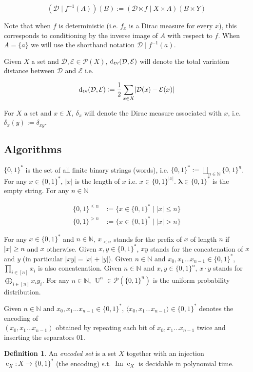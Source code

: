 \documentclass[11pt]{article}
\numberwithin{equation}{section}
\theoremstyle{definition}
\newtheorem{definition}{Definition}[section]
\theoremstyle{plain}
\newcommand{\Bool}{\{0,1\}}
\newcommand{\Words}{{\Bool^*}}
\newcommand{\WordsLen}[1]{{\Bool^{#1}}}
\DeclareMathOperator{\Img}{Im}
\DeclareMathOperator{\Un}{U}
\DeclareMathOperator{\En}{c}
\newcommand{\Dtv}{\operatorname{d}_{\textnormal{tv}}}
\newcommand{\Nats}{\mathbb{N}}
\newcommand{\Estr}{\bm{\lambda}}
\newcommand{\Abs}[1]{\lvert #1 \rvert}
\newcommand{\Chev}[1]{\langle #1 \rangle}
\newcommand{\Dist}{\mathcal{D}}
\begin{document}
\[(\Dist \mid f^{-1}(A))(B):=(\Dist \ltimes f \mid X \times A)(B \times Y)\]

Note that when $f$ is deterministic (i.e. $f_x$ is a Dirac measure for every $x$), this corresponds to conditioning by the inverse image of $A$ with respect to $f$. When $A=\{a\}$ we will use the shorthand notation $\Dist \mid f^{-1}(a)$.

Given $X$ a set and $\Dist,\mathcal{E} \in \mathcal{P}(X)$, $\Dtv(\Dist,\mathcal{E})$ will denote the total variation distance between $\Dist$ and $\mathcal{E}$ i.e.

\[\Dtv(\Dist,\mathcal{E}):=\frac{1}{2}\sum_{x \in X} \Abs{\Dist(x) - \mathcal{E}(x)}\]

For $X$ a set and $x \in X$, $\delta_x$ will denote the Dirac measure associated with $x$, i.e. $\delta_x(y):=\delta_{xy}$.

\subsection{Algorithms}

$\Words$ is the set of all finite binary strings (words), i.e. $\Words:=\bigsqcup_{n \in \Nats} \Bool^n$. For any ${x \in \Words}$, $\Abs{x}$ is the length of $x$ i.e. $x \in \WordsLen{\Abs{x}}$. ${\Estr \in \Words}$ is the empty string. For any $n \in \Nats$

\begin{align*}
\Bool^{\leq n}&:=\{x \in \Words \mid \Abs{x} \leq n\} \\
\Bool^{>n}&:=\{x \in \Words \mid \Abs{x} > n\}
\end{align*}

For any $x \in \Words$ and $n \in \Nats$, $x_{< n}$ stands for the prefix of $x$ of length $n$ if $\Abs{x} \geq n$ and $x$ otherwise. Given $x,y \in \Words$, $xy$ stands for the concatenation of $x$ and $y$ (in particular $\Abs{xy}=\Abs{x}+\Abs{y}$). Given ${n \in \Nats}$ and ${x_0, x_1 \ldots x_{n-1} \in \Words}$, ${\prod_{i \in [n]} x_i}$ is also concatenation. Given $n \in \Nats$ and $x,y \in \WordsLen{n}$, $x \cdot y$ stands for $\bigoplus_{i \in [n]} x_i y_i$. For any $n \in \Nats$, $\Un^n \in \mathcal{P}(\WordsLen{n})$ is the uniform probability distribution.

Given $n \in \Nats$ and ${x_0, x_1 \ldots x_{n-1} \in \Words}$, $\Chev{x_0,x_1 \ldots x_{n-1}} \in \Words$ denotes the encoding of\\ $(x_0,x_1 \ldots x_{n-1})$ obtained by repeating each bit of $x_0, x_1 \ldots x_{n-1}$ twice and inserting the separators 01.
\begin{definition}

An \emph{encoded set} is a set $X$ together with an injection ${\En_X: X \rightarrow \Words}$ (the encoding) s.t. $\Img \En_X$ is decidable in polynomial time.

\end{definition}
\end{document}

